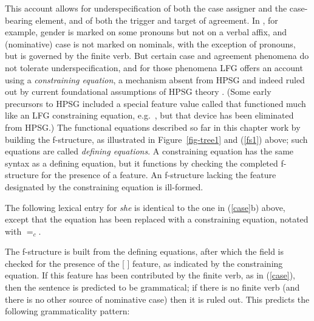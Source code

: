 This account allows for underspecification of both the case assigner and the case-bearing element,
and of both the trigger and target of agreement.   In  , for example, gender is marked on
some pronouns but not on a verbal affix, and (nominative) case is not marked on   nominals, with the
exception of  pronouns, but is governed by the finite verb.  But certain case and agreement
phenomena do not tolerate underspecification, and for those phenomena LFG offers an account using a
\textit{constraining equation}, a mechanism absent from HPSG and indeed ruled out by current
foundational assumptions of HPSG theory .  (Some early precursors to HPSG included a special feature value called  that functioned much like an LFG constraining equation, e.g.\ \citealt[36--37]{Shieber86a}, but that device has been eliminated from HPSG.)  The functional equations described so far in this chapter work by building the f-structure, as illustrated in Figure~\ref{fig-tree1} and (\ref{fs1}) above; such equations are called \textit{defining equations}.  A constraining equation has the same syntax as a defining equation, but it functions by checking the completed f-structure for the presence of a feature.  An f-structure lacking the feature designated by the constraining equation is ill-formed.  

The following lexical entry for \textit{she} is identical to the one in (\ref{case}b) above, except that the  equation has been replaced with a constraining equation, notated with $=_c$.  

\ea
\label{constrain}
{\qquad{} }
\z
The f-structure is built from the defining equations, after which the \subj{} field is checked for the presence of the [ ] feature, as indicated by the constraining equation.  If this feature has been contributed by the finite verb, as in (\ref{case}), then the sentence is predicted to be grammatical; if there is no finite verb (and there is no other source of nominative case) then it is ruled out.  This predicts the following grammaticality pattern:

